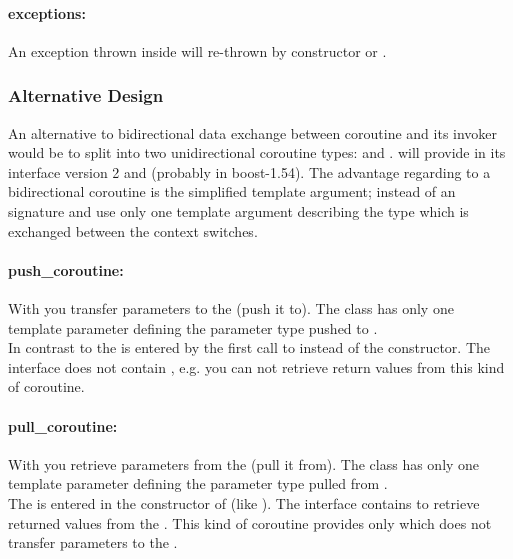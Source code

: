 \paragraph*{exceptions:}
An exception thrown inside \corofunction will re-thrown by \coro constructor or
\coroop.


\subsubsection*{Alternative Design}
An alternative to bidirectional data exchange between coroutine and its invoker
would be to split \coro into two unidirectional coroutine types: \pushcoro and
\pullcoro. \boostcoroutine will provide in its interface version 2 \pushcoro and
\pullcoro (probably in boost-1.54). The advantage regarding to a bidirectional
coroutine is the simplified template argument; instead of an signature
\pullcoro and \pushcoro use only one template argument describing the type
which is exchanged between the context switches.

\paragraph*{push\_coroutine:}
With \pushcoro you transfer parameters to the \corofunction (push it to). The
class has only one template parameter defining the parameter type pushed to
\corofunction.\\
\newline
In contrast to \coro the \corofunction is entered by the first call to
\pushcoroop instead of the constructor. The interface does not contain
\coroget, e.g. you can not retrieve return values from this kind of coroutine.

\paragraph*{pull\_coroutine:}
With \pullcoro you retrieve parameters from the \corofunction (pull it from).
The class has only one template parameter defining the parameter type pulled
from \corofunction.\\
\newline
The \corofunction is entered in the constructor of \corofunction (like \coro).
The interface contains \coroget to retrieve returned values from the
\corofunction.  This kind of coroutine provides only \pullcoroop which
does not transfer parameters to the \corofunction.

